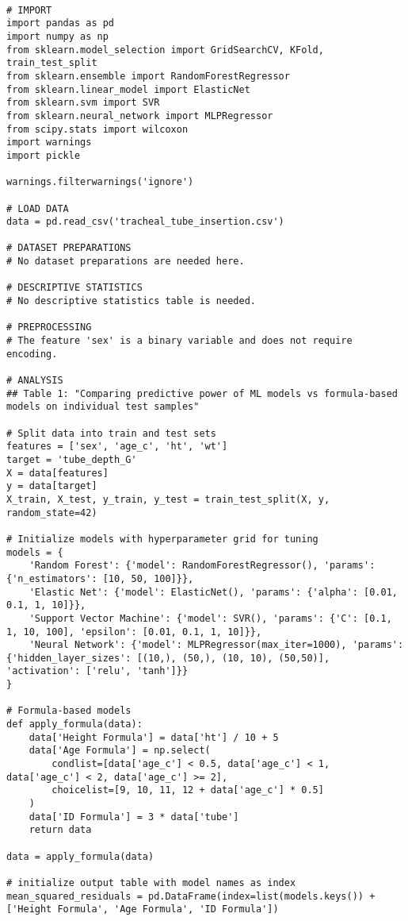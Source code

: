 \documentclass[11pt]{article}
\begin{document}
\begin{verbatim}

# IMPORT
import pandas as pd
import numpy as np
from sklearn.model_selection import GridSearchCV, KFold, train_test_split
from sklearn.ensemble import RandomForestRegressor
from sklearn.linear_model import ElasticNet
from sklearn.svm import SVR
from sklearn.neural_network import MLPRegressor
from scipy.stats import wilcoxon
import warnings
import pickle

warnings.filterwarnings('ignore')

# LOAD DATA
data = pd.read_csv('tracheal_tube_insertion.csv')

# DATASET PREPARATIONS
# No dataset preparations are needed here.

# DESCRIPTIVE STATISTICS
# No descriptive statistics table is needed.

# PREPROCESSING
# The feature 'sex' is a binary variable and does not require encoding.

# ANALYSIS
## Table 1: "Comparing predictive power of ML models vs formula-based models on individual test samples"

# Split data into train and test sets
features = ['sex', 'age_c', 'ht', 'wt']
target = 'tube_depth_G'
X = data[features]
y = data[target]
X_train, X_test, y_train, y_test = train_test_split(X, y, random_state=42)

# Initialize models with hyperparameter grid for tuning
models = {
    'Random Forest': {'model': RandomForestRegressor(), 'params': {'n_estimators': [10, 50, 100]}},
    'Elastic Net': {'model': ElasticNet(), 'params': {'alpha': [0.01, 0.1, 1, 10]}},
    'Support Vector Machine': {'model': SVR(), 'params': {'C': [0.1, 1, 10, 100], 'epsilon': [0.01, 0.1, 1, 10]}},
    'Neural Network': {'model': MLPRegressor(max_iter=1000), 'params': {'hidden_layer_sizes': [(10,), (50,), (10, 10), (50,50)], 'activation': ['relu', 'tanh']}}
}

# Formula-based models
def apply_formula(data):
    data['Height Formula'] = data['ht'] / 10 + 5
    data['Age Formula'] = np.select(
        condlist=[data['age_c'] < 0.5, data['age_c'] < 1, data['age_c'] < 2, data['age_c'] >= 2], 
        choicelist=[9, 10, 11, 12 + data['age_c'] * 0.5]
    )
    data['ID Formula'] = 3 * data['tube']
    return data

data = apply_formula(data)

# initialize output table with model names as index
mean_squared_residuals = pd.DataFrame(index=list(models.keys()) + ['Height Formula', 'Age Formula', 'ID Formula'])


\end{verbatim}
\end{document}
